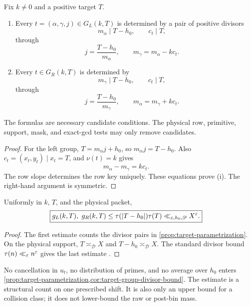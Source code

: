 \begin{proposition}
\label{prop:target-parametrization}
Fix \(k\ne0\) and a positive target \(T\).

\begin{enumerate}[label=(\roman*),leftmargin=2.2em]
\item Every \(t=(\alpha,\gamma,j)\in G_L(k,T)\) is determined by a
  pair of positive divisors
  \[
   m_\alpha\mid T-h_0,\qquad c_t\mid T,
  \]
  through
  \[
   j=\frac{T-h_0}{m_\alpha},\qquad
   m_\gamma=m_\alpha-kc_t.
  \]
\item Every \(t\in G_R(k,T)\) is determined by
  \[
   m_\gamma\mid T-h_0,\qquad c_t\mid T,
  \]
  through
  \[
   j=\frac{T-h_0}{m_\gamma},\qquad
   m_\alpha=m_\gamma+kc_t.
  \]
\end{enumerate}
The formulas are necessary candidate conditions.  The physical row,
primitive, support, mask, and exact-gcd tests may only remove
candidates.
\end{proposition}

\begin{proof}
For the left group, \(T=m_\alpha j+h_0\), so
\(m_\alpha j=T-h_0\).  Also \(c_t=(x_t,y_t)\mid x_t=T\), and
\(\nu(t)=k\) gives
\[
 m_\alpha-m_\gamma=kc_t.
\]
The row slope determines the row key uniquely.  These equations prove
(i).  The right-hand argument is symmetric.
\end{proof}

\medskip
\begin{corollary}
\label{cor:target-group-divisor-bound}
Uniformly in \(k\), \(T\), and the physical packet,
\begin{equation}
 \boxed{
 g_L(k,T),\ g_R(k,T)
 \le
 \tau(|T-h_0|)\tau(T)
 \ll_{\varepsilon,h_0,\mathscr D}X^\varepsilon.}
\label{eq:target-group-divisor-bound}
\end{equation}
\end{corollary}

\begin{proof}
The first estimate counts the divisor pairs in
\cref{prop:target-parametrization}.  On the physical support,
\(T\asymp_{\mathscr D}X\) and \(T-h_0\asymp_{\mathscr D}X\).
The standard divisor bound \(\tau(n)\ll_\varepsilon n^\varepsilon\) gives the last
estimate \citep{IwaniecKowalski2004}.
\end{proof}

\begin{remark}
No cancellation in \(u_t\), no distribution of primes, and no
average over \(h_0\) enters
\cref{prop:target-parametrization,cor:target-group-divisor-bound}.
The estimate is a structural count on one prescribed shift.  It is
also only an upper bound for a collision class; it does not lower-bound
the raw or post-bin mass.
\end{remark}
